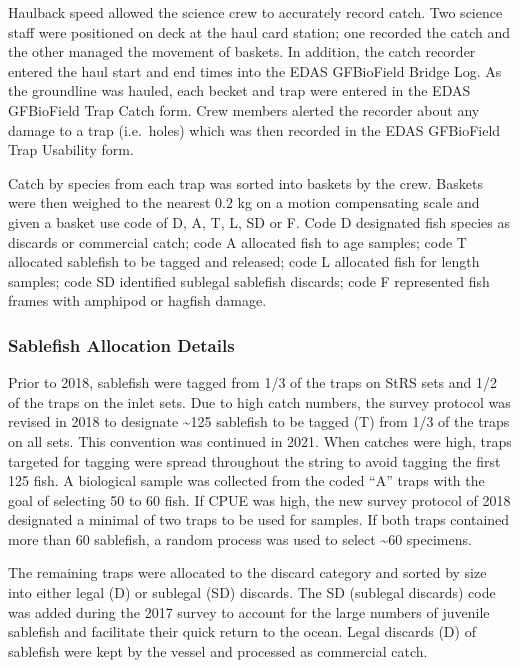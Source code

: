 \documentclass[12pt]{article}\usepackage[]{graphicx}\usepackage[]{color}
\begin{document}
Haulback speed allowed the science crew to accurately record catch. Two science staff were positioned on deck at the haul card station; one recorded the catch and the other managed the movement of baskets. In addition, the catch recorder entered the haul start and end times into the EDAS GFBioField Bridge Log. As the groundline was hauled, each becket and trap were entered in the EDAS GFBioField Trap Catch form. Crew members alerted the recorder about any damage to a trap (i.e.~holes) which was then recorded in the EDAS GFBioField Trap Usability form.

Catch by species from each trap was sorted into baskets by the crew. Baskets were then weighed to the nearest 0.2 kg on a motion compensating scale and given a basket use code of D, A, T, L, SD or F. Code D designated fish species as discards or commercial catch; code A allocated fish to age samples; code T allocated sablefish to be tagged and released; code L allocated fish for length samples; code SD identified sublegal sablefish discards; code F represented fish frames with amphipod or hagfish damage.

\hypertarget{sablefish-allocation-details}{%
\subsubsection{Sablefish Allocation Details}\label{sablefish-allocation-details}}

Prior to 2018, sablefish were tagged from 1/3 of the traps on StRS sets and 1/2 of the traps on the inlet sets. Due to high catch numbers, the survey protocol was revised in 2018 to designate \textasciitilde125 sablefish to be tagged (T) from 1/3 of the traps on all sets. This convention was continued in 2021. When catches were high, traps targeted for tagging were spread throughout the string to avoid tagging the first 125 fish. A biological sample was collected from the coded ``A'' traps with the goal of selecting 50 to 60 fish. If CPUE was high, the new survey protocol of 2018 designated a minimal of two traps to be used for samples. If both traps contained more than 60 sablefish, a random process was used to select \textasciitilde60 specimens.

The remaining traps were allocated to the discard category and sorted by size into either legal (D) or sublegal (SD) discards. The SD (sublegal discards) code was added during the 2017 survey to account for the large numbers of juvenile sablefish and facilitate their quick return to the ocean. Legal discards (D) of sablefish were kept by the vessel and processed as commercial catch.
\end{document}
